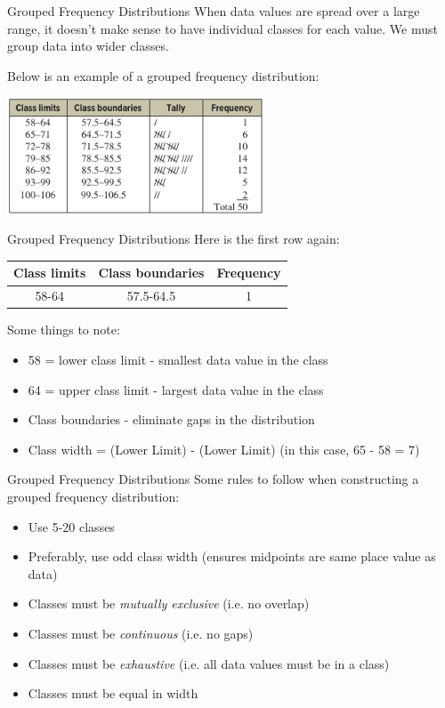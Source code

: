 \documentclass[t, aspectratio=169]{beamer}
\newcommand{\?}{\stackrel{?}{=}}
\begin{document}
	\begin{frame}{Grouped Frequency Distributions}
		When data values are spread over a large range, it doesn't make sense to have individual classes for each value. We must group data into wider classes. \pause
		
		Below is an example of a grouped frequency distribution:
		
		\includegraphics[width=3in]{sample-gfd.png}	
	\end{frame}

	\begin{frame}{Grouped Frequency Distributions}
		Here is the first row again: \pause
		
		\begin{tabular}{|c|c|c|}
			\hline Class limits & Class boundaries & Frequency \\ \hline
			58-64 & 57.5-64.5 & 1 \\ \hline
		\end{tabular} \pause
	
		Some things to note: \begin{itemize} \vspace{-12pt}
			\item 58 = lower class limit - smallest data value in the class \pause
			\item 64 = upper class limit - largest data value in the class \pause
			\item Class boundaries - eliminate gaps in the distribution \pause
			\item Class width = (Lower Limit) - (Lower Limit) (in this case, 65 - 58 = 7)
		\end{itemize}
	\end{frame}

	\begin{frame}{Grouped Frequency Distributions}
		Some rules to follow when constructing a grouped frequency distribution: \begin{itemize} \vspace{-12pt} \pause
			\item Use 5-20 classes \pause
			\item Preferably, use odd class width (ensures midpoints are same place value as data) \pause
			\item Classes must be \textit{mutually exclusive} (i.e. no overlap) \pause
			\item Classes must be \textit{continuous} (i.e. no gaps) \pause
			\item Classes must be \textit{exhaustive} (i.e. all data values must be in a class) \pause
			\item Classes must be equal in width
		\end{itemize}
	\end{frame}
\end{document}
